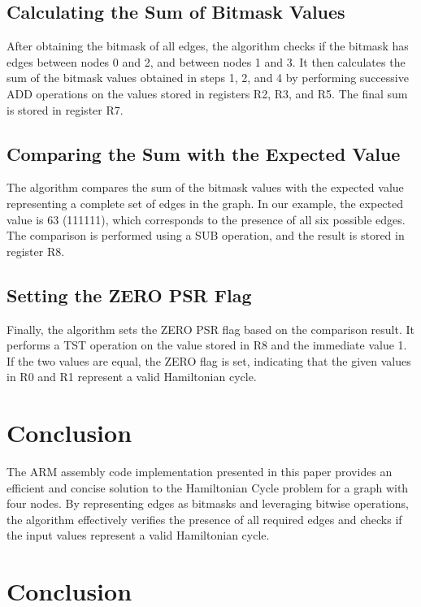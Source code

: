 {\subsection{Calculating the Sum of Bitmask Values}

After obtaining the bitmask of all edges, the algorithm checks if the bitmask has edges between nodes 0 and 2, and between nodes 1 and 3. It then calculates the sum of the bitmask values obtained in steps 1, 2, and 4 by performing successive ADD operations on the values stored in registers R2, R3, and R5. The final sum is stored in register R7.

\subsection{Comparing the Sum with the Expected Value}

The algorithm compares the sum of the bitmask values with the expected value representing a complete set of edges in the graph. In our example, the expected value is 63 (111111), which corresponds to the presence of all six possible edges. The comparison is performed using a SUB operation, and the result is stored in register R8.

\subsection{Setting the ZERO PSR Flag}

Finally, the algorithm sets the ZERO PSR flag based on the comparison result. It performs a TST operation on the value stored in R8 and the immediate value 1. If the two values are equal, the ZERO flag is set, indicating that the given values in R0 and R1 represent a valid Hamiltonian cycle.

\section{Conclusion}

The ARM assembly code implementation presented in this paper provides an efficient and concise solution to the Hamiltonian Cycle problem for a graph with four nodes. By representing edges as bitmasks and leveraging bitwise operations, the algorithm effectively verifies the presence of all required edges and checks if the input values represent a valid Hamiltonian cycle.

\section{Conclusion}\label{sec:conclusion}

}
